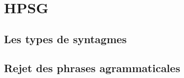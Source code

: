 %
\section{HPSG}

\subsection{Les types de syntagmes}





\subsection{Rejet des phrases agrammaticales}

